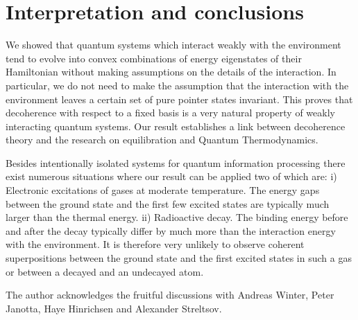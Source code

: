 \documentclass[aps,prl,twocolumn,showpacs,showkeys,a4paper]{revtex4}
\begin{document}
\section{Interpretation and conclusions}
\label{sec:conclusions}
%
We showed that quantum systems which interact weakly with the environment tend to evolve into convex combinations of energy eigenstates of their Hamiltonian without making assumptions on the details of the interaction.
In particular, we do not need to make the assumption that the interaction with the environment leaves a certain set of pure pointer states invariant.
This proves that decoherence with respect to a fixed basis is a very natural property of weakly interacting quantum systems.
Our result establishes a link between decoherence theory and the research on equilibration and Quantum Thermodynamics.

Besides intentionally isolated systems for quantum information processing there exist numerous situations where our result can be applied two of which are:
i) Electronic excitations of gases at moderate temperature.
The energy gaps between the ground state and the first few excited states are typically much larger than the thermal energy.
ii) Radioactive decay. 
The binding energy before and after the decay typically differ by much more than the interaction energy with the environment.
It is therefore very unlikely to observe coherent superpositions between the ground state and the first excited states in such a gas or between a decayed and an undecayed atom. 

The author acknowledges the fruitful discussions with Andreas Winter, Peter Janotta, Haye Hinrichsen and Alexander Streltsov.



%
%
%
%
%
\end{document}
